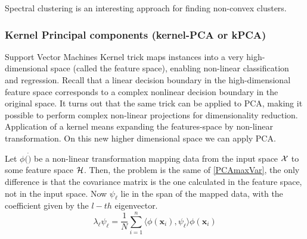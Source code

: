 \documentclass[12pt, letterpaper]{article}
\theoremstyle{definition}
\newcommand{\x}{\mathbf{x}}
\begin{document}
Spectral clustering is an interesting approach for finding non-convex clusters. 
\subsubsection{Kernel Principal components  (kernel-PCA or kPCA)}
\label{KPCA}
Support Vector Machines Kernel trick maps instances into a very high-dimensional space (called the feature space), enabling non-linear classification and regression. Recall that a linear decision boundary in the high-dimensional feature space corresponds to a complex nonlinear decision boundary in the original space.
It turns out that the same trick can be applied to PCA, making it possible to perform complex non-linear projections for dimensionality reduction. Application of a kernel means expanding the features-space by non-linear transformation. On this new higher dimensional space we can apply PCA.

Let $\phi(\dot)$ be a non-linear transformation mapping data from the input space $\CMcal{X}$ to some feature space $\CMcal{H}$. Then, the problem is the same of \autoref{PCAmaxVar}, the only difference is that the covariance matrix is the one calculated in the feature space, not in the input space. Now $\psi_\ell$ lie in the span of the mapped data, with the coefficient given by the $l-th$ eigenvector.
\begin{equation}
\lambda_\ell\psi_\ell = \frac{1}{N}\sum_{i=1}^n \langle \phi(\x_i), \psi_\ell\rangle \phi(\x_i)
\end{equation}
\end{document}
